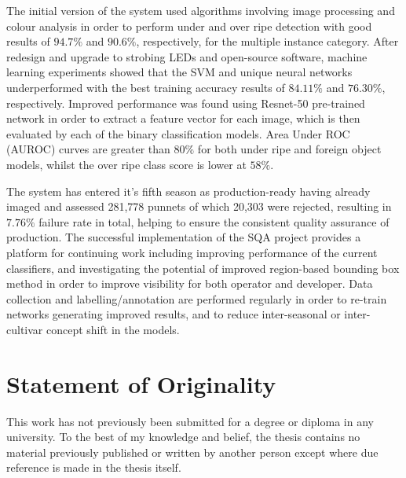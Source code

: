 \documentclass[fleqn,twoside,12pt]{report}
\begin{document}
The initial version of the system used algorithms involving image processing and colour analysis in order to perform under and over ripe detection with good results of $94.7\%$ and $90.6\%$, respectively, for the multiple instance category. After redesign and upgrade to strobing LEDs and open-source software, machine learning experiments showed that the SVM and unique neural networks underperformed with the best training accuracy results of $84.11\%$ and $76.30\%$, respectively. Improved performance was found using Resnet-50 pre-trained network in order to extract a feature vector for each image, which is then evaluated by each of the binary classification models. Area Under ROC (AUROC) curves are greater than $80\%$ for both under ripe and foreign object models, whilst the over ripe class score is lower at $58\%$. 

The system has entered it's fifth season as production-ready having already imaged and assessed 281,778 punnets of which 20,303 were rejected, resulting in $7.76\%$ failure rate in total, helping to ensure the consistent quality assurance of production. The successful implementation of the SQA project provides a platform for continuing work including improving performance of the current classifiers, and investigating the potential of improved region-based bounding box method in order to improve visibility for both operator and developer. Data collection and labelling/annotation are performed regularly in order to re-train networks generating improved results, and to reduce inter-seasonal or inter-cultivar concept shift in the models. 





\vspace*{\fill}%




\newpage

\chapter*{Statement of Originality}

This work has not previously been submitted for a degree or diploma in any university. To the best of my knowledge and belief, the thesis contains no material previously published or written by another person except where due reference is made in the thesis itself.
\end{document}
